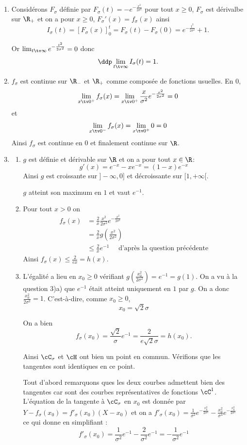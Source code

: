\begin{correction}
\begin{enumerate}
\item Considérons $F_\sigma$ définie par $F_\sigma(t) =-e^{-\frac{x^2}{2\sigma^2}}$ pour tout $x\geq 0$, $F_\sigma$ est dérivalbe sur $\R_+$ et on a pour $x\geq 0$, $F_\sigma'(x) = f_\sigma(x)$ ainsi
$$I_\sigma( t) =\left[ F_\sigma(x) \right]_0^t = F_\sigma(t) -F_\sigma(0)= e^{-\frac{t^2}{2\sigma^2}}+1.$$

Or $\lim_{t\tv \infty} e^{-\frac{t^2}{2\sigma^2}}=0$ donc 
$$\ddp \lim_{t\tv \infty} I_\sigma(t) =1.$$
\item $f_\sigma $ est continue sur $\R_- $ et $\R_+$ comme composée de fonctions usuelles. En $0$, 
$$\lim_{x\tv 0^+} f_\sigma(x)  = \lim_{x\tv 0^+} \frac{x}{\sigma^2}e^{-\frac{x^2}{2\sigma^2}}  =0$$ 
et 
$$\lim_{x\tv 0^-} f_\sigma(x)  = \lim_{x\tv 0^+} 0 =0$$ 
Ainsi $f_\sigma $ est continue en $0$ et finalement continue sur $\R$. 
\item 
\begin{enumerate}
\item $g$ est définie et dérivable sur $\R$ et on a pour tout $x\in \R$: 
$$g'(x) = e^{-x} -xe^{-x} = (1-x) e^{-x}$$
Ainsi $g$ est croissante sur $]-\infty, 0] $ et décroissante sur $[1,+\infty[$. 

$g$ atteint son maximum en $1$ et vaut $e^{-1}$. 
\item Pour tout $x> 0$ on   
\begin{align*}
f_\sigma(x)& = \frac{2}{x}  \frac{x^2}{2\sigma^2}e^{-\frac{x^2}{2\sigma^2}} \\
				&= \frac{2}{x}   g(\frac{x^2}{2\sigma^2})\\
				&\leq \frac{2}{x}   e^{-1} \quad \text{ d'après la question précédente} 
\end{align*}
 Ainsi $f_\sigma(x) \leq \frac{2}{ex} =h(x)$.  
\item L'égalité a lieu en $x_0\geq 0$ vérifiant $g(\frac{x_0^2}{2\sigma^2})=e^{-1} =g(1)$. On a vu à la question 3)a) que $e^{-1}$ était atteint uniquement en $1$ par $g$. On a  donc $\frac{x_0^2}{2\sigma^2} =1$. 
C'est-à-dire, comme $x_0\geq 0$, $$x_0=\sqrt{2}\sigma$$

On a bien $$f_\sigma (x_0) = \frac{\sqrt{2}}{\sigma} e^{-1} = \frac{2}{e \sqrt{2} \sigma} = h(x_0).$$

Ainsi $\cC_\sigma $ et $\cH$ ont bien un point en commun. Vérifions que les tangentes sont identiques en ce point. 

Tout d'abord remarquons ques les deux courbes admettent bien  des tangentes car sont des courbes représentatives de fonctions $\cC^1$. L'équation de la tangente à $\cC_\sigma$ en $x_0$ est donnée par 
$Y - f_\sigma(x_0) = f'_\sigma(x_0) (X-x_0)$
et on a $f'_\sigma(x_0) = \frac{1}{\sigma^2} e^{-\frac{x_0^2}{2\sigma^2}}  - \frac{x_0^2}{\sigma^4}e^{-\frac{x_0^2}{2\sigma^2}} $ ce qui donne en  simplifiant :
$$f'_\sigma(x_0) =  \frac{1}{\sigma^2} e^{-1} - \frac{2}{\sigma^2}e^{-1}= - \frac{1}{\sigma^2}e^{-1} $$


\end{enumerate}
\end{enumerate}
\end{correction}

